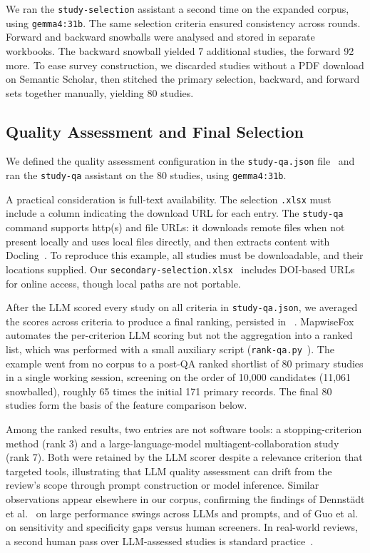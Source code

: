 \documentclass[preprint,12pt, a4paper]{elsarticle}
\begin{document}
We ran the \texttt{study-selection} assistant a second time on the expanded
corpus, using \texttt{gemma4:31b}. The same selection criteria ensured
consistency across rounds. Forward and backward snowballs were analysed and
stored in separate workbooks. The backward snowball yielded 7 additional
studies, the forward 92 more. To ease survey construction, we discarded
studies without a PDF download on Semantic Scholar, then stitched the primary
selection, backward, and forward sets together manually, yielding 80 studies.

\subsection{Quality Assessment and Final Selection}

We defined the quality assessment configuration in the
\texttt{study-\allowbreak qa.json} file~\cite{olar2026-config-examples} and
ran the \texttt{study-qa} assistant on the 80 studies, using \texttt{gemma4:31b}.

A practical consideration is full-text availability. The selection
\texttt{.xlsx} must include a column indicating the download URL for each entry.
The \texttt{study-qa} command supports http(s) and file URLs: it downloads remote files
when not present locally and uses local files directly, and then extracts content
with Docling~\cite{docling2024}. To reproduce this example, all studies must
be downloadable, and their locations supplied. Our
\texttt{secondary-\allowbreak selection.xlsx}~\cite{olar2026-config-examples}
includes DOI-based URLs for online access, though local paths are not portable.

After the LLM scored every study on all criteria in \texttt{study-qa.json},
we averaged the scores across criteria to produce a final ranking, persisted in
~\cite{olar2026-config-examples}.
MapwiseFox automates the per-criterion LLM scoring but not the aggregation
into a ranked list, which was performed with a small auxiliary script
(\texttt{rank-\allowbreak qa.py}~\cite{olar2026-config-examples}). The example went from
no corpus to a post-QA ranked shortlist of 80 primary studies in a single working
session, screening on the order of 10{,}000 candidates (11{,}061 snowballed), roughly
65 times the initial 171 primary records. The final 80 studies form the basis of the
feature comparison below.

Among the ranked results, two entries are not software tools: a
stopping-criterion method (rank 3) and a large-language-model
multiagent-collaboration study (rank 7). Both were retained by the LLM
scorer despite a relevance criterion that targeted tools, illustrating that
LLM quality assessment can drift from the review's scope through prompt
construction or model inference. Similar observations appear elsewhere in our
corpus, confirming the findings of Dennst\"adt et al.~\cite{dennstadt2024}
on large performance swings across LLMs and prompts, and of Guo et al.~\cite{guo2024}
on sensitivity and specificity gaps versus human screeners. In real-world
reviews, a second human pass over LLM-assessed studies is standard
practice~\cite{laignelot2026}.
\end{document}
